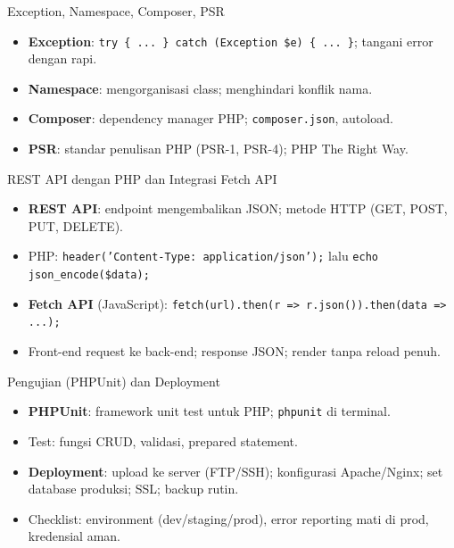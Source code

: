 \documentclass[handout]{beamer}
\begin{document}
\begin{frame}{Exception, Namespace, Composer, PSR}
	\begin{itemize}
		\item \textbf{Exception}: \texttt{try \{ ... \} catch (Exception \$e) \{ ... \}}; tangani error dengan rapi.
		\item \textbf{Namespace}: mengorganisasi class; menghindari konflik nama.
		\item \textbf{Composer}: dependency manager PHP; \texttt{composer.json}, autoload.
		\item \textbf{PSR}: standar penulisan PHP (PSR-1, PSR-4); PHP The Right Way.
	\end{itemize}
\end{frame}

\begin{frame}{REST API dengan PHP dan Integrasi Fetch API}
	\begin{itemize}
		\item \textbf{REST API}: endpoint mengembalikan JSON; metode HTTP (GET, POST, PUT, DELETE).
		\item PHP: \texttt{header('Content-Type: application/json');} lalu \texttt{echo json\_encode(\$data);}
		\item \textbf{Fetch API} (JavaScript): \texttt{fetch(url).then(r => r.json()).then(data => ...);}
		\item Front-end request ke back-end; response JSON; render tanpa reload penuh.
	\end{itemize}
\end{frame}

\begin{frame}{Pengujian (PHPUnit) dan Deployment}
	\begin{itemize}
		\item \textbf{PHPUnit}: framework unit test untuk PHP; \texttt{phpunit} di terminal.
		\item Test: fungsi CRUD, validasi, prepared statement.
		\item \textbf{Deployment}: upload ke server (FTP/SSH); konfigurasi Apache/Nginx; set database produksi; SSL; backup rutin.
		\item Checklist: environment (dev/staging/prod), error reporting mati di prod, kredensial aman.
	\end{itemize}
\end{frame}
\end{document}

